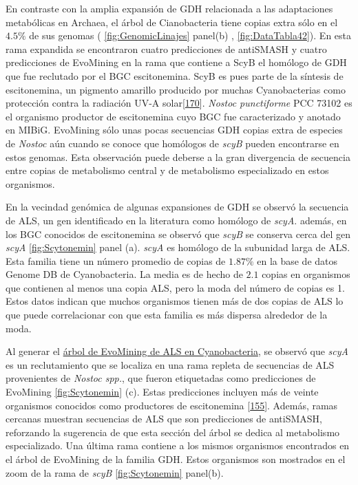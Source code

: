 \documentclass[12pt,twoside]{reedthesis}
\begin{document}
  En contraste con la amplia expansión de GDH relacionada a las
  adaptaciones metabólicas en Archaea, el árbol de Cianobacteria tiene
  copias extra sólo en el \(4.5\%\) de sus genomas (
  \autoref{fig:GenomicLinajes} panel(b) , \autoref{fig:DataTabla42}). En
  esta rama expandida se encontraron cuatro predicciones de antiSMASH y
  cuatro predicciones de EvoMining en la rama que contiene a ScyB el
  homólogo de GDH que fue reclutado por el BGC escitonemina. ScyB es pues
  parte de la síntesis de escitonemina, un pigmento amarillo producido por
  muchas Cyanobacterias como protección contra la radiación UV-A
  solar{[}\protect\hyperlink{ref-balskus_genetic_2010}{170}{]}.
  \emph{Nostoc punctiforme} PCC 73102 es el organismo productor de
  escitonemina cuyo BGC fue caracterizado y anotado en MIBiG. EvoMining
  sólo unas pocas secuencias GDH copias extra de especies de \emph{Nostoc}
  aún cuando se conoce que homólogos de \emph{scyB} pueden encontrarse en
  estos genomas. Esta observación puede deberse a la gran divergencia de
  secuencia entre copias de metabolismo central y de metabolismo
  especializado en estos organismos.
  
  En la vecindad genómica de algunas expansiones de GDH se observó la
  secuencia de ALS, un gen identificado en la literatura como homólogo de
  \emph{scyA}. además, en los BGC conocidos de escitonemina se observó que
  \emph{scyB} se conserva cerca del gen \emph{scyA}
  \autoref{fig:Scytonemin} panel (a). \emph{scyA} es homólogo de la
  subunidad larga de ALS. Esta familia tiene un número promedio de copias
  de \(1.87\%\) en la base de datos Genome DB de Cyanobacteria. La media
  es de hecho de \(2.1\) copias en organismos que contienen al menos una
  copia ALS, pero la moda del número de copias es 1. Estos datos indican
  que muchos organismos tienen más de dos copias de ALS lo que puede
  correlacionar con que esta familia es más dispersa alrededor de la moda.
  
  Al generar el
  \href{https://microreact.org/project/B11HkUtdm?tt=cr.}{árbol de
  EvoMining de ALS en Cyanobacteria}, se observó que \emph{scyA} es un
  reclutamiento que se localiza en una rama repleta de secuencias de ALS
  provenientes de \emph{Nostoc spp.}, que fueron etiquetadas como
  predicciones de EvoMining \autoref{fig:Scytonemin} (c). Estas
  predicciones incluyen más de veinte organismos conocidos como
  productores de escitonemina
  {[}\protect\hyperlink{ref-balskus_investigating_2008}{155}{]}. Además,
  ramas cercanas muestran secuencias de ALS que son predicciones de
  antiSMASH, reforzando la sugerencia de que esta sección del árbol se
  dedica al metabolismo especializado. Una última rama contiene a los
  mismos organismos encontrados en el árbol de EvoMining de la familia
  GDH. Estos organismos son mostrados en el zoom de la rama de \emph{scyB}
  \autoref{fig:Scytonemin} panel(b).
  
\end{document}
